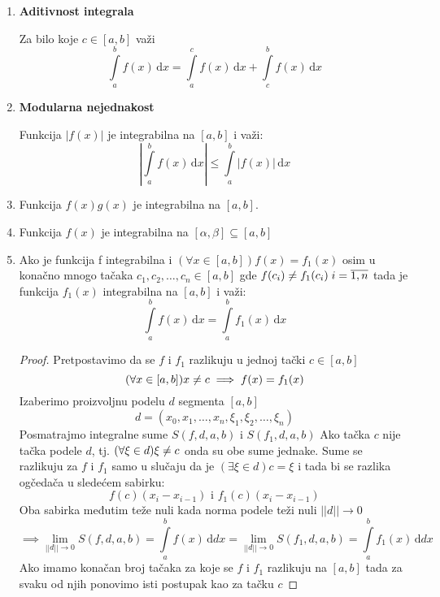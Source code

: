 \begin{enumerate}[label=\textbf{\arabic*.)}]
	\item
		\textbf{Aditivnost integrala}
		\begin{theorem}
			Za bilo koje $c\in [a,b]$ važi $$\int\limits^b_a f(x) \, \mathrm{d} x = \int\limits^c_a f(x) \, \mathrm{d} x + \int\limits^b_c f(x) \, \mathrm{d} x$$
		\end{theorem}
	\item
		\textbf{Modularna nejednakost}
		\begin{theorem}
			Funkcija $|f(x)|$ je integrabilna na $[a,b]$ i važi:
			$$\left| \int \limits^b_a f(x) \, \mathrm{d} x \right| \leq \int \limits^b_a |f(x)| \, \mathrm{d} x$$ 
		\end{theorem}
	\item \begin{theorem}
			Funkcija $f(x)g(x)$ je integrabilna na $[a,b]$.
		\end{theorem}
	\item \begin{theorem}
			Funkcija $f(x)$ je integrabilna na $[\alpha, \beta] \subseteq [a,b]$
		\end{theorem}
	\item
		\begin{theorem}
			Ako je funkcija f integrabilna i $(\forall x \in [a,b]) f(x)=f_1(x)$ osim u konačno mnogo tačaka $c_1, c_2, \ldots, c_n\in[a,b]$ gde $f(c_i) \centernot = f_1(c_i)\; i= \overline{1, n}$ tada je funkcija $f_1(x)$ integrabilna na $[a,b]$ i važi:
			$$\int \limits^b_a f(x) \, \mathrm{d} x = \int \limits^b_a f_1(x) \, \mathrm{d} x$$
		\end{theorem}
		\begin{proof}
			Pretpostavimo da se $f$ i $f_1$ razlikuju u jednoj tački $c \in [a,b]$
			$$(\forall x \in [a,b])x\centernot = c \implies f(x)=f_1(x)$$
			Izaberimo proizvoljnu podelu $d$ segmenta $[a,b]$
			$$d=(x_0, x_1, \ldots,x_n, \xi_1, \xi_2, \ldots, \xi_n)$$
			Posmatrajmo integralne sume $S(f, d, a, b)$ i $S(f_1, d, a, b)$
			Ako tačka $c$ nije tačka podele $d$, tj. $(\forall \xi \in d) \xi\centernot = c$ onda su obe sume jednake. 
			Sume se razlikuju za $f$ i $f_1$ samo u slučaju da je $(\exists \xi \in d) c = \xi$ i tada bi se razlika ogčedača u sledećem sabirku:
			$$f(c)(x_i-x_{i-1}) \text{ i } f_1(c)(x_i-x_{i-1})$$
			Oba sabirka međutim teže nuli kada norma podele teži nuli $||d||\to 0$
			$$\implies \lim_{||d||\to 0} S(f, d, a, b) = \int \limits^b_a f(x) \, \mathrm{d}dx = \lim_{||d||\to 0} S(f_1, d, a, b) = \int \limits^b_a f_1(x) \, \mathrm{d}dx  $$
			Ako imamo konačan broj tačaka za koje se $f$ i $f_1$ razlikuju na $[a,b]$ tada za svaku od njih ponovimo isti postupak kao za tačku $c$

\end{proof}
\end{enumerate}
